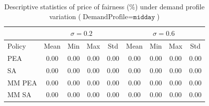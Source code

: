 \begin{table}[h]
\centering
\caption{Descriptive statistics of price of fairness (\%) under demand profile variation ($\text{DemandProfile}=\texttt{midday}$)}
\label{tab:price_of_fairness_demand}
\begin{tabular}{lcccccccc}
\hline
 & \multicolumn{4}{c}{$\sigma = 0.2$} & \multicolumn{4}{c}{$\sigma = 0.6$} \\
\hline
Policy & Mean & Min & Max & Std & Mean & Min & Max & Std \\
\hline
 PEA & 0.00 & 0.00 & 0.00 & 0.00 & 0.00 & 0.00 & 0.00 & 0.00 \\
 SA & 0.00 & 0.00 & 0.00 & 0.00 & 0.00 & 0.00 & 0.00 & 0.00 \\
 MM PEA & 0.00 & 0.00 & 0.00 & 0.00 & 0.00 & 0.00 & 0.00 & 0.00 \\
 MM SA & 0.00 & 0.00 & 0.00 & 0.00 & 0.00 & 0.00 & 0.00 & 0.00 \\
\hline
\end{tabular}
\end{table}
